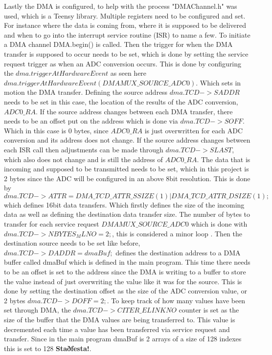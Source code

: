 Lastly the DMA is configured, to help with the process "DMAChannel.h" was used, which is a Teensy library.
Multiple registers need to be configured and set.
For instance where the data is coming from, where it is supposed to be delivered and when to go into the interrupt service routine (ISR) to name a few.
To initiate a DMA channel DMA.begin() is called.
Then the trigger for when the DMA transfer is supposed to occur needs to be set, which is done by setting the service request trigger as when an ADC conversion occurs.
This is done by configuring the $dma.triggerAtHardwareEvent$ as seen here $dma.triggerAtHardwareEvent(DMAMUX\_SOURCE\_ADC0)$.
Which sets in motion the DMA transfer.
Defining the source address $dma.TCD->SADDR$ needs to be set in this case, the location of the results of the ADC conversion, $ADC0\_RA$.
If the source address changes between each DMA transfer, there needs to be an offset put on the address which is done via $dma.TCD->SOFF$. 
Which in this case is 0 bytes, since $ADC0\_RA$ is just overwritten for each ADC conversion and its address does not change.
If the source address changes between each ISR call then adjustments can be made through $dma.TCD->SLAST$, which also does not change and is still the address of $ADC0\_RA$.
The data that is incoming and supposed to be transmitted needs to be set, which in this project is 2 bytes since the ADC will be configured in an above 8bit resolution.
This is done by $dma.TCD->ATTR = DMA\_TCD\_ATTR\_SSIZE(1) | DMA\_TCD\_ATTR\_DSIZE(1);$ which defines 16bit data transfers.
Which firstly defines the size of the incoming data as well as defining the destination data transfer size.
The number of bytes to transfer for each service request $DMAMUX\_SOURCE\_ADC0$ which is done with  $dma.TCD->NBYTES_MLNO = 2;$, this is considered a minor loop .
Then the destination source needs to be set like before, $dma.TCD->DADDR = dmaBuf;$ defines the destination address to a DMA buffer called dmaBuf which is defined in the main program.
This time there needs to be an offset is set to the address since the DMA is writing to a buffer to store the value instead of just overwriting the value like it was for the source.
This is done by setting the destination offset as the size of the ADC conversion value, or 2 bytes $dma.TCD->DOFF = 2;$.
To keep track of how many values have been set through DMA, the  $dma.TCD->CITER\_ELINKNO $ counter is set as the size of the buffer that the DMA values are being transferred to.
This value is decremented each time a value has been transferred via service request and transfer.
Since in the main program dmaBuf is 2 arrays of a size of 128 indexes this is set to 128 \textbf{Staðfesta!}.
